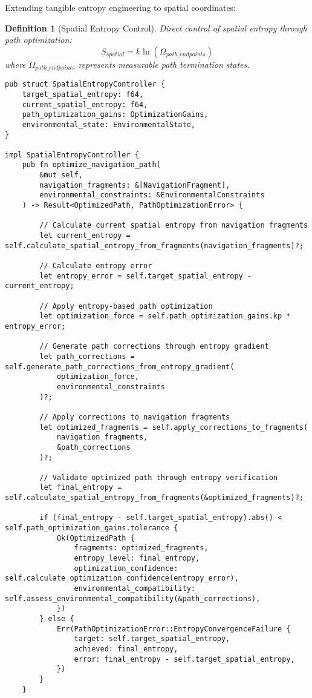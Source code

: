\documentclass[12pt,a4paper]{article}
\newtheorem{definition}[theorem]{Definition}
\begin{document}
Extending tangible entropy engineering to spatial coordinates:

\begin{definition}[Spatial Entropy Control]
Direct control of spatial entropy through path optimization:
\begin{equation}
S_{spatial} = k \ln(\Omega_{path\_endpoints})
\end{equation}
where $\Omega_{path\_endpoints}$ represents measurable path termination states.
\end{definition}

\begin{lstlisting}[style=ruststyle, caption=Spatial Entropy Engineering Implementation]
pub struct SpatialEntropyController {
    target_spatial_entropy: f64,
    current_spatial_entropy: f64,
    path_optimization_gains: OptimizationGains,
    environmental_state: EnvironmentalState,
}

impl SpatialEntropyController {
    pub fn optimize_navigation_path(
        &mut self,
        navigation_fragments: &[NavigationFragment],
        environmental_constraints: &EnvironmentalConstraints
    ) -> Result<OptimizedPath, PathOptimizationError> {
        
        // Calculate current spatial entropy from navigation fragments
        let current_entropy = self.calculate_spatial_entropy_from_fragments(navigation_fragments)?;
        
        // Calculate entropy error
        let entropy_error = self.target_spatial_entropy - current_entropy;
        
        // Apply entropy-based path optimization
        let optimization_force = self.path_optimization_gains.kp * entropy_error;
        
        // Generate path corrections through entropy gradient
        let path_corrections = self.generate_path_corrections_from_entropy_gradient(
            optimization_force,
            environmental_constraints
        )?;
        
        // Apply corrections to navigation fragments
        let optimized_fragments = self.apply_corrections_to_fragments(
            navigation_fragments,
            &path_corrections
        )?;
        
        // Validate optimized path through entropy verification
        let final_entropy = self.calculate_spatial_entropy_from_fragments(&optimized_fragments)?;
        
        if (final_entropy - self.target_spatial_entropy).abs() < self.path_optimization_gains.tolerance {
            Ok(OptimizedPath {
                fragments: optimized_fragments,
                entropy_level: final_entropy,
                optimization_confidence: self.calculate_optimization_confidence(entropy_error),
                environmental_compatibility: self.assess_environmental_compatibility(&path_corrections),
            })
        } else {
            Err(PathOptimizationError::EntropyConvergenceFailure {
                target: self.target_spatial_entropy,
                achieved: final_entropy,
                error: final_entropy - self.target_spatial_entropy,
            })
        }
    }
    

\end{lstlisting}
\end{document}

